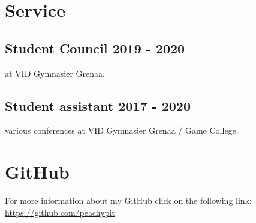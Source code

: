\documentclass[12]{article}
\begin{document}
\section{Service}

\subsection{Student Council 2019 - 2020}
at VID Gymnasier Grenaa.

\subsection{Student assistant 2017 - 2020}
various conferences at VID Gymnasier Grenaa / Game College.

\section{GitHub}

For more information about my GitHub click on the following link:
\href{https://github.com/peachypit}{\\ https://github.com/peachypit}
\end{document}
